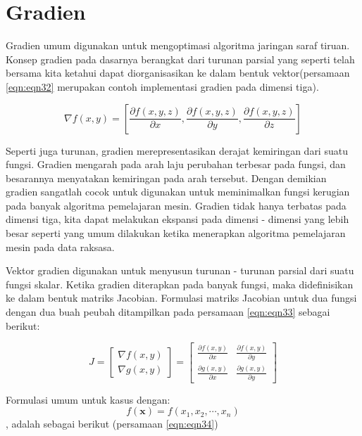 \section{Gradien}
Gradien umum digunakan untuk mengoptimasi algoritma jaringan saraf tiruan. Konsep gradien pada dasarnya berangkat dari turunan parsial yang seperti telah bersama kita ketahui dapat diorganisasikan ke dalam bentuk vektor(persamaan \ref{eqn:eqn32} merupakan contoh implementasi gradien pada dimensi tiga).

\begin{equation}\label{eqn:eqn32}
\nabla f(x,y) = \left[\frac{\partial f(x,y,z)}{\partial x}, \frac{\partial f(x,y,z)}{\partial y}, \frac{\partial f(x,y,z)}{\partial z}\right]
\end{equation} 

Seperti juga turunan, gradien merepresentasikan derajat kemiringan dari suatu fungsi. Gradien mengarah pada arah laju perubahan terbesar pada fungsi, dan besarannya menyatakan kemiringan pada arah tersebut. Dengan demikian gradien sangatlah cocok untuk digunakan untuk meminimalkan fungsi kerugian pada banyak algoritma pemelajaran mesin. Gradien tidak hanya terbatas pada dimensi tiga, kita dapat melakukan ekspansi pada dimensi - dimensi yang lebih besar seperti yang umum dilakukan ketika menerapkan algoritma pemelajaran mesin pada data raksasa.

Vektor gradien digunakan untuk menyusun turunan - turunan parsial dari suatu fungsi skalar. Ketika gradien diterapkan pada banyak fungsi, maka didefinisikan ke dalam bentuk matriks Jacobian. Formulasi matriks Jacobian untuk dua fungsi dengan dua buah peubah ditampilkan pada persamaan \ref{eqn:eqn33} sebagai berikut:

\begin{equation}\label{eqn:eqn33}
J = \begin{bmatrix}\nabla f(x,y) \\ \nabla g(x,y)\end{bmatrix} = \begin{bmatrix}\frac{\partial f(x,y)}{\partial x} & \frac{\partial f(x,y)}{\partial y} \\ \frac{\partial g(x,y)}{\partial x} & \frac{\partial g(x,y)}{\partial y} \end{bmatrix}
\end{equation} 

Formulasi umum untuk kasus dengan:
\begin{dmath*}
f(\mathbf{x}) = f(x_{1}, x_{2}, \cdots , x_{n}) 
\end{dmath*}
, adalah sebagai berikut (persamaan \ref{eqn:eqn34})

